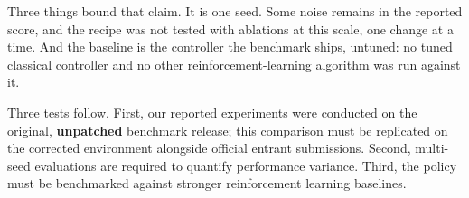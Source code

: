 \documentclass{article}
\begin{document}
Three things bound that claim. It is one seed. Some noise remains in the reported score, and the recipe was not tested with ablations at this scale, one change at a time. And the baseline is the controller the benchmark ships, untuned: no tuned classical controller and no other reinforcement-learning algorithm was run against it.

Three tests follow. First, our reported experiments were conducted on the original, \textbf{unpatched} benchmark release; this comparison must be replicated on the corrected environment alongside official entrant submissions. Second, multi-seed evaluations are required to quantify performance variance. Third, the policy must be benchmarked against stronger reinforcement learning baselines.


\clearpage

\nocite{*}

\end{document}
